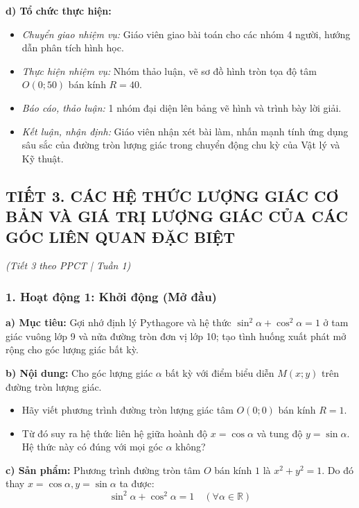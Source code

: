 \documentclass[12pt, a4paper]{article}
\begin{document}
\textbf{d) Tổ chức thực hiện:}
\begin{itemize}[leftmargin=0.6cm]
    \item \textit{Chuyển giao nhiệm vụ:} Giáo viên giao bài toán cho các nhóm 4 người, hướng dẫn phân tích hình học.
    \item \textit{Thực hiện nhiệm vụ:} Nhóm thảo luận, vẽ sơ đồ hình tròn tọa độ tâm $O(0; 50)$ bán kính $R = 40$.
    \item \textit{Báo cáo, thảo luận:} 1 nhóm đại diện lên bảng vẽ hình và trình bày lời giải.
    \item \textit{Kết luận, nhận định:} Giáo viên nhận xét bài làm, nhấn mạnh tính ứng dụng sâu sắc của đường tròn lượng giác trong chuyển động chu kỳ của Vật lý và Kỹ thuật.
\end{itemize}

\vspace{10pt}
\subsection*{TIẾT 3. CÁC HỆ THỨC LƯỢNG GIÁC CƠ BẢN VÀ GIÁ TRỊ LƯỢNG GIÁC CỦA CÁC GÓC LIÊN QUAN ĐẶC BIỆT}
\textit{(Tiết 3 theo PPCT | Tuần 1)}

\subsubsection*{1. Hoạt động 1: Khởi động (Mở đầu)}
\textbf{a) Mục tiêu:} Gợi nhớ định lý Pythagore và hệ thức $\sin^2\alpha + \cos^2\alpha = 1$ ở tam giác vuông lớp 9 và nửa đường tròn đơn vị lớp 10; tạo tình huống xuất phát mở rộng cho góc lượng giác bất kỳ.

\textbf{b) Nội dung:} Cho góc lượng giác $\alpha$ bất kỳ với điểm biểu diễn $M(x; y)$ trên đường tròn lượng giác.
\begin{itemize}[leftmargin=0.6cm]
    \item Hãy viết phương trình đường tròn lượng giác tâm $O(0; 0)$ bán kính $R = 1$.
    \item Từ đó suy ra hệ thức liên hệ giữa hoành độ $x = \cos\alpha$ và tung độ $y = \sin\alpha$. Hệ thức này có đúng với mọi góc $\alpha$ không?
\end{itemize}

\textbf{c) Sản phẩm:} Phương trình đường tròn tâm $O$ bán kính $1$ là $x^2 + y^2 = 1$. Do đó thay $x = \cos\alpha, y = \sin\alpha$ ta được:
$$\sin^2\alpha + \cos^2\alpha = 1 \quad (\forall \alpha \in \mathbb{R})$$
\end{document}
